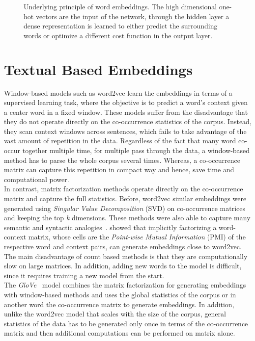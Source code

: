 \begin{figure}
\centering 
\resizebox{0.8\textwidth}{0.5\textwidth}{      

}
\caption{Underlying principle of word embeddings. The high dimensional one-hot vectors are the input of the network, through the hidden layer a dense representation is learned to either predict the surrounding words or optimize a different cost function in the output layer.}
\label{fig:emb}
\end{figure}
\section{Textual Based Embeddings }
\label{sec:textual}
Window-based models such as word2vec learn the embeddings in terms of a supervised learning task, where the objective is to predict a word's context given a center word in a fixed window. These models suffer from the disadvantage that they do not operate directly on the co-occurrence statistics of the corpus. Instead, they scan context windows across sentences, which fails to take advantage of the vast amount of repetition in the data. Regardless of the fact that many word co-occur together multiple time, for multiple pass through the data, a window-based method has to parse the whole corpus several times. Whereas, a co-occurrence matrix can capture this repetition in compact way and hence, save time and computational power.  \\
In contrast, matrix factorization methods operate directly on the co-occurrence matrix and capture the full statistics. Before, word2vec similar embeddings were generated using \emph{Singular Value Decomposition} (SVD) on co-occurrence matrices and keeping the top \emph{k} dimensions. These methods were also able to capture many semantic and syntactic analogies~.  showed that implicitly factorizing
a word-context matrix, whose cells are the \emph{Point-wise Mutual Information} (PMI) of
the respective word and context pairs, can generate embeddings close to word2vec. The main disadvantage of count based methods is that they are computationally slow on large matrices. In addition, adding new words to the model is difficult, since it requires training a new model from the start.\\
The \emph{GloVe}~ model combines the matrix factorization for generating embeddings with window-based methods and uses the global statistics of the corpus or in another word the co-occurrence matrix to generate embeddings. In addition, unlike the word2vec model that scales with the size of the corpus, general statistics of the data has to be generated only once in terms of the co-occurrence matrix and then additional computations can be performed on matrix alone.

